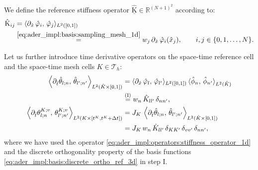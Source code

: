 \documentclass{scrreprt}
\theoremstyle{definition}
\theoremstyle{nonumberplain}
\newcommand{\laMat}[1]{\underline{\mathrm{#1}}}
\newcommand{\laMatel}[1]{\mathrm{#1}}
\newcommand{\tria}{\mathcal{T}_h}
\newcommand{\cell}{K}
\newcommand{\refCell}{\hat{\cell}}
\newcommand{\detJ}{J_\cell}
\begin{document}
We define the reference stiffness operator
$\laMat{\refCell}\in\mathbb{R}^{(N+1)^2}$ according to:
\begin{align}
\label{eq:ader_impl:operators:stiffness_operator_1d}
\laMatel{\refCell}_{ij} &=
\langle
\partial_{\hat{x}}\,\hat{\varphi}_{i},\,\hat{\varphi}_{j}\rangle_{L^2([0,1])}
\notag\\
&
\overset{\eqref{eq:ader_impl:basis:sampling_mesh_1d}}
=
w_{j}\,
\partial_{\hat{x}}\,\hat{\varphi}_{i}(\hat{x}_{j}),\qquad
i,j\in\{0,1,\ldots,N\}.
\end{align}

Let us further introduce time derivative operators on the space-time reference
cell and the space-time mesh cells $\cell\in\tria$:
\begin{align}
\label{eq:ader_impl:operators:stiffness_operator_time_ref}
\left\langle
\partial_{\hat{t}}\hat{\theta}_{l;n},\,
\hat{\theta}_{l';n'}
\right\rangle
_{L^2(\refCell\times[0,1])}
&=
\langle
\partial_{\hat{x}}\,\hat{\varphi}_{l},\,\hat{\varphi}_{l'}\rangle_{L^2([0,1])}
\,
\langle \hat{\phi}_{n},\,\hat{\phi}_{n'}\rangle_{L^2(\refCell)}\notag
\\
&\overset{\textup{(I)}}{=}
w_{n}\,\refCell_{ll'}\,\delta_{n n'},
\\
\label{eq:ader_impl:operators:stiffness_operator_time_mesh}
\left\langle
\partial_{\hat{t}}\theta^{\cell;v}_{l;n},\,
\theta^{\cell;v}_{l';n'}
\right\rangle
_{L^2(\cell\times[t^\cell,t^\cell+\Delta t])}
&=
\detJ\,
\left\langle
\partial_{\hat{t}}\hat{\theta}_{l;n},\,
\hat{\theta}_{l';n'}
\right\rangle
_{L^2(\refCell\times[0,1])}
\notag
\\
&=
\detJ\,
w_{n}\,
\refCell_{ll'}\,
\delta_{\cell\cell'}\,\delta_{vv'}\,
\delta_{n n'},
\end{align}
where we have used the operator
\eqref{eq:ader_impl:operators:stiffness_operator_1d} and
the discrete orthogonality property of the basis functions
\eqref{eq:ader_impl:basis:discrete_ortho_ref_3d} in step I.
\end{document}
